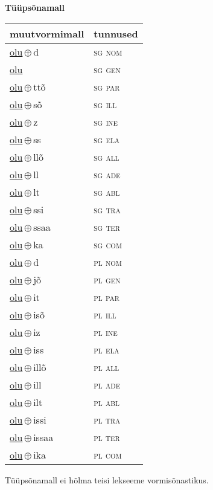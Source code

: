 

\vspace{3.5em}
\noindent \begin{minipage}{\textwidth}
\noindent \textbf{Tüüpsõnamall \,}\\

\begin{sideways}
\begin{tabular}{l l}
muutvormimall & tunnused \\
\hline
\underline{olu}\,$\oplus$\,d & \textsc{ sg nom } \\
\underline{olu} & \textsc{ sg gen } \\
\underline{olu}\,$\oplus$\,ttõ & \textsc{ sg par } \\
\underline{olu}\,$\oplus$\,sõ & \textsc{ sg ill } \\
\underline{olu}\,$\oplus$\,z & \textsc{ sg ine } \\
\underline{olu}\,$\oplus$\,ss & \textsc{ sg ela } \\
\underline{olu}\,$\oplus$\,llõ & \textsc{ sg all } \\
\underline{olu}\,$\oplus$\,ll & \textsc{ sg ade } \\
\underline{olu}\,$\oplus$\,lt & \textsc{ sg abl } \\
\underline{olu}\,$\oplus$\,ssi & \textsc{ sg tra } \\
\underline{olu}\,$\oplus$\,ssaa & \textsc{ sg ter } \\
\underline{olu}\,$\oplus$\,ka & \textsc{ sg com } \\
\underline{olu}\,$\oplus$\,d & \textsc{ pl nom } \\
\underline{olu}\,$\oplus$\,jõ & \textsc{ pl gen } \\
\underline{olu}\,$\oplus$\,it & \textsc{ pl par } \\
\underline{olu}\,$\oplus$\,isõ & \textsc{ pl ill } \\
\underline{olu}\,$\oplus$\,iz & \textsc{ pl ine } \\
\underline{olu}\,$\oplus$\,iss & \textsc{ pl ela } \\
\underline{olu}\,$\oplus$\,illõ & \textsc{ pl all } \\
\underline{olu}\,$\oplus$\,ill & \textsc{ pl ade } \\
\underline{olu}\,$\oplus$\,ilt & \textsc{ pl abl } \\
\underline{olu}\,$\oplus$\,issi & \textsc{ pl tra } \\
\underline{olu}\,$\oplus$\,issaa & \textsc{ pl ter } \\
\underline{olu}\,$\oplus$\,ika & \textsc{ pl com } \\
\end{tabular}
\end{sideways}
\label{tab:tüüpsõnamall-olud}

\end{minipage}

 
\vspace{1em}
\noindent Tüüpsõnamall  ei hõlma teisi lekseeme vormi\-sõnastikus.
